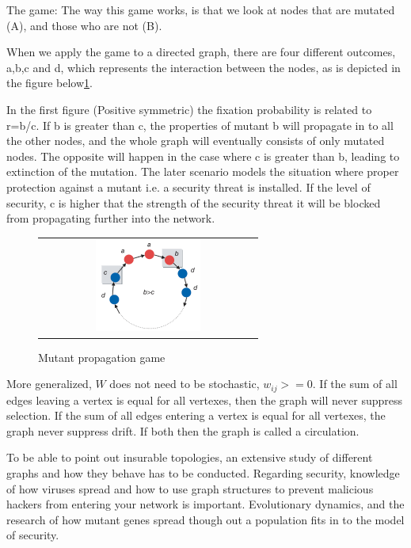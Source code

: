  
The game:
The way this game works, is that we look at nodes that are mutated (A), and those who are not (B).  


When we apply the game to a directed graph, there are four different outcomes, a,b,c and d, which represents the interaction between the nodes, as is depicted in the figure below\ref{fig:game}. 

In the first figure (Positive symmetric) the fixation probability is related to r=b/c. If b is greater than c, the properties of mutant b will propagate in to all the other nodes, and the whole graph will eventually consists of only mutated nodes. The opposite will happen in the case where c is greater than b, leading to extinction of the mutation. The later scenario models the situation where proper protection against a mutant i.e. a security threat is installed. If the level of security, c is higher that the strength of the security threat it will be blocked from propagating further into the network. 


\begin{figure}[h]
\centering
\begin{tabular}{@{}c@{}}
\includegraphics[width=0.5\textwidth]{natureGameSingle.png}
\end{tabular}
\caption{\label{fig:game} Mutant propagation game}
\end{figure}


More generalized, $W$ does not need to be stochastic, $w_{ij}>=0$. 
If the sum of all edges leaving a vertex is equal for all vertexes, then the graph will never suppress selection.
If the sum of all edges entering a vertex is equal for all vertexes, the graph never suppress drift.
If both then the graph is called a circulation.
     
To be able to point out insurable topologies, an extensive study of different graphs and how they behave has to be conducted. Regarding security, knowledge of how viruses spread and how to use graph structures to prevent malicious hackers from entering your network is important. Evolutionary dynamics, and the research of how mutant genes spread though out a population fits in to the model of security. 

